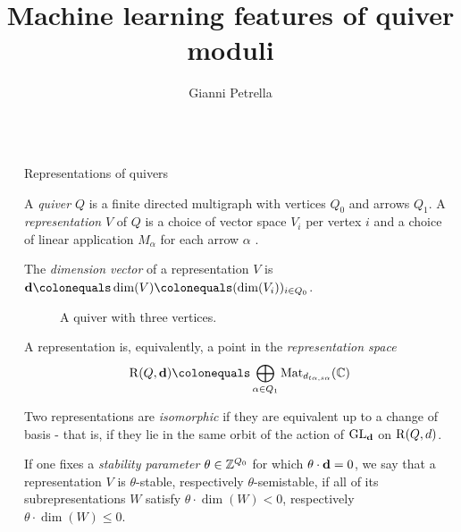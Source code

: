 \documentclass[final,20pt]{beamer}
\title{Machine learning features of quiver moduli}
\author{Gianni Petrella \inst{1}}
\institute[shortinst]{\inst{1} University of Luxembourg}
\newlength{\sepwidth}
\newlength{\colwidth}
\newcommand{\separatorcolumn}{\begin{column}{\sepwidth}\end{column}}
\begin{document}
\begin{frame}[t]
\begin{columns}[t]
\separatorcolumn

\begin{column}{\colwidth}

  \begin{block}{Representations of quivers}

  A \emph{quiver} $Q$ is a finite directed multigraph with vertices $Q_0$ and arrows $Q_1$.
  A \emph{representation} $V$ of $Q$ is a choice of vector space $V_i$ per vertex $i$
  and a choice of linear application $M_{\alpha}$ for each arrow $\alpha$ \cite{2311.17003}.

  The \emph{dimension vector} of a representation $V$
  is~$\tuple{d} \colonequals \dim(V) \colonequals (\dim(V_i))_{i \in Q_0}$.

    \begin{figure}
      \centering
      \caption{A quiver with three vertices.}
    \end{figure}

    A representation is, equivalently, a point
    in the \emph{representation space}
    \begin{equation}
      \repspace(Q, \tuple{d}) \colonequals \bigoplus_{\alpha \in Q_1} \operatorname{Mat}_{d_{t\alpha, s\alpha}}(\CC)
    \end{equation}

    Two representations are \emph{isomorphic} if they are equivalent up to
    a change of basis -
    that is, if they lie in the same orbit of the action
    of $\operatorname{GL}_{\mathbf{d}}$ on $\operatorname{R}(Q, d)$.

    If one fixes a \emph{stability parameter} $\theta \in \mathbb{Z}^{Q_0}$ for which
    $\theta \cdot \mathbf{d} = 0$, we say that a representation $V$
    is $\theta$-stable, respectively $\theta$-semistable,
    if all of its subrepresentations $W$ satisfy
    $\theta \cdot \dim(W) < 0$, respectively
    $\theta\cdot\dim(W)\leq 0$.


\end{block}
\end{column}
\end{columns}
\end{frame}
\end{document}
